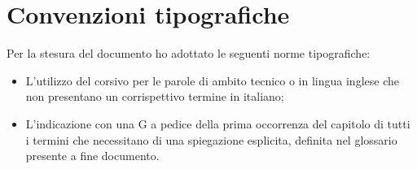 
\cleardoublepage
{}
{}
\begingroup
\let\clearpage\relax
\let\cleardoublepage\relax
\let\cleardoublepage\relax

\chapter*{Convenzioni tipografiche}

Per la stesura del documento ho adottato le seguenti norme tipografiche:\\

\begin{itemize}
	\item L'utilizzo del corsivo per le parole di ambito tecnico o in lingua inglese che non presentano un corrispettivo termine in italiano; 
	\item L'indicazione con una G a pedice della prima occorrenza del capitolo di tutti i termini che necessitano di una spiegazione esplicita, definita nel glossario presente a fine documento.
\end{itemize}



%
%

\endgroup			

\vfill

